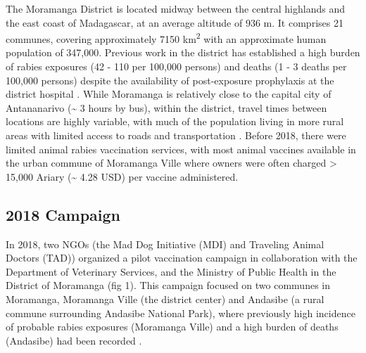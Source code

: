 \documentclass[tropicalmed,article,submit,moreauthors,pdftex]{mdpi}
\begin{document}
The Moramanga District is located midway between the central highlands
and the east coast of Madagascar, at an average altitude of 936 m. It
comprises 21 communes, covering approximately 7150 km\textsuperscript{2}
with an approximate human population of 347,000\citep{instat2021}.
Previous work in the district has established a high burden of rabies
exposures (42 - 110 per 100,000 persons) and deaths (1 - 3 deaths per
100,000 persons) despite the availability of post-exposure prophylaxis
at the district hospital \citep{rajeev2018}. While Moramanga is
relatively close to the capital city of Antananarivo (\textasciitilde{}
3 hours by bus), within the district, travel times between locations are
highly variable, with much of the population living in more rural areas
with limited access to roads and transportation \citep{rajeev2020}.
Before 2018, there were limited animal rabies vaccination services, with
most animal vaccines available in the urban commune of Moramanga Ville
where owners were often charged \textgreater{} 15,000 Ariary
(\textasciitilde{} 4.28 USD) per vaccine administered.

\hypertarget{campaign}{%
\subsection{2018 Campaign}\label{campaign}}

In 2018, two NGOs (the Mad Dog Initiative (MDI) and Traveling Animal
Doctors (TAD)) organized a pilot vaccination campaign in collaboration
with the Department of Veterinary Services, and the Ministry of Public
Health in the District of Moramanga (fig 1). This campaign focused on
two communes in Moramanga, Moramanga Ville (the district center) and
Andasibe (a rural commune surrounding Andasibe National Park), where
previously high incidence of probable rabies exposures (Moramanga Ville)
and a high burden of deaths (Andasibe) had been recorded
\citep{rajeev2018}.
\end{document}
